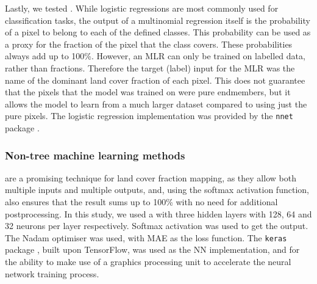 \documentclass[review,authoryear,3p]{elsarticle}
\begin{document}

Lastly, we tested .
While logistic regressions are most commonly used for classification tasks, the output of a multinomial regression itself is the probability of a pixel to belong to each of the defined classes.
This probability can be used as a proxy for the fraction of the pixel that the class covers.
These probabilities always add up to 100\%.
However, an \ac{MLR} can only be trained on labelled data, rather than fractions.
Therefore the target (label) input for the \ac{MLR} was the name of the dominant land cover fraction of each pixel.
This does not guarantee that the pixels that the model was trained on were pure endmembers, but it allows the model to learn from a much larger dataset compared to using just the pure pixels.
The logistic regression implementation was provided by the \texttt{nnet} package \citep{nnet}.

\subsubsection{Non-tree machine learning methods}

 are a promising technique for land cover fraction mapping, as they allow both multiple inputs and multiple outputs, and, using the softmax activation function, also ensures that the result sums up to 100\% with no need for additional postprocessing.
In this study, we used a  with three hidden layers with 128, 64 and 32 neurons per layer respectively.
Softmax activation was used to get the output.
The Nadam optimiser \citep{dozat_incorporating_2016} was used, with \gls{MAE} as the loss function.
The \texttt{keras} package \citep{keras}, built upon TensorFlow, was used as the \ac{NN} implementation, and for the ability to make use of a graphics processing unit to accelerate the neural network training process.

\end{document}
